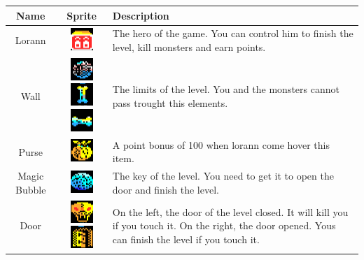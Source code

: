 \documentclass{report}
\begin{document}
\begin{center}
\begin{tabulary}{0.9\linewidth}{|c|c|L|}
\hline
Name & Sprite & Description \\
\hline
\hline
Lorann & \includegraphics[scale=0.7]{resources/sprites/lorann_b.png} & The hero of the game. You can control him to finish the level, kill monsters and earn points. \\
\hline
Wall & \includegraphics[scale=0.7]{resources/sprites/bone.png}\includegraphics[scale=0.7]{resources/sprites/vertical_bone.png}\includegraphics[scale=0.7]{resources/sprites/horizontal_bone.png} & The limits of the level. You and the monsters cannot pass trought this elements. \\
\hline
Purse & \includegraphics[scale=0.7]{resources/sprites/purse.png} & A point bonus of 100 when lorann come hover this item. \\
\hline
Magic Bubble & \includegraphics[scale=0.7]{resources/sprites/crystal_ball.png} & The key of the level. You need to get it to open the door and finish the level. \\
\hline
Door & \includegraphics[scale=0.7]{resources/sprites/gate_closed.png}\includegraphics[scale=0.7]{resources/sprites/gate_open.png} & On the left, the door of the level closed. It will kill you if you touch it. On the right, the door opened. Yous can finish the level if you touch it. \\

\end{tabulary}
\end{center}
\end{document}

